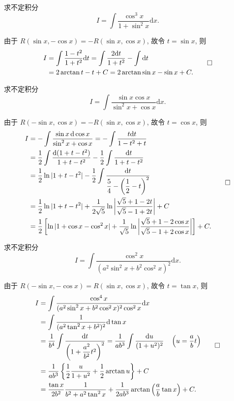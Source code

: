 \begin{example}\label{example:ma-6-3-4}
求不定积分
\[
  I=\int\frac{\cos^3x}{1+\sin^2x}\mathrm dx.
\]
\end{example}

\begin{solve}
由于 $R(\sin x,-\cos x)=-R(\sin x,\cos x)$, 故令 $t=\sin x$, 则
\[
\begin{aligned}
  I
  &=
  \int\frac{1-t^2}{1+t^2}\mathrm dt
  =
  \int\frac{2\mathrm dt}{1+t^2}-\int\mathrm dt\\
  &=
  2\arctan t-t+C
  =
  2\arctan\sin x-\sin x+C.
\end{aligned}
\qedhere
\]
\end{solve}


\begin{example}\label{example:ma-6-3-5}
求不定积分
\[
  I=\int\frac{\sin x\cos x}{\sin^2x+\cos x}\mathrm dx.
\]
\end{example}

\begin{solve}
由于 $R(-\sin x,\cos x)=-R(\sin x,\cos x)$, 故令 $t=\cos x$, 则
\[
\begin{aligned}
  I
  &=
  -\int\frac{\sin x\,\mathrm d\cos x}{\sin^2x+\cos x}
  =
  -\int\frac{t\mathrm dt}{1-t^2+t}\\
  &=
  \frac12\int\frac{\mathrm d(1+t-t^2)}{1+t-t^2}
  -\frac12\int\frac{\mathrm dt}{1+t-t^2}\\
  &=
  \frac12\ln|1+t-t^2|-\frac12\int\frac{\mathrm dt}{\dfrac54-\left(\dfrac12-t\right)^2}\\
  &=
  \frac12\ln|1+t-t^2|+
  \frac1{2\sqrt5}\ln\left|\frac{\sqrt5+1-2t}{\sqrt5-1+2t}\right|+C\\
  &=
  \frac12\left[
  \ln|1+\cos x-\cos^2x|+
  \frac1{\sqrt5}\ln\left|\frac{\sqrt5+1-2\cos x}{\sqrt5-1+2\cos x}\right|
  \right]+C.
\end{aligned}
\qedhere
\]
\end{solve}


\begin{example}\label{example:ma-6-3-6}
求不定积分
\[
  I=\int\frac{\cos^2x}{(a^2\sin^2x+b^2\cos^2x)^2}\mathrm dx.
\]
\end{example}

\begin{solve}
由于 $R(-\sin x,-\cos x)=R(\sin x,\cos x)$, 故令 $t=\tan x$, 则
\[
\begin{aligned}
  I
  &=
  \int\frac{\cos^4x}{(a^2\sin^2x+b^2\cos^2x)^2\cos^2x}\mathrm dx\\
  &=
  \int\frac{1}{(a^2\tan^2x+b^2)^2}\mathrm d\tan x\\
  &=
  \frac1{b^4}\int\frac{\mathrm dt}{\left(1+\dfrac{a^2}{b^2}t^2\right)^2}
  =
  \frac1{ab^3}\int\frac{\mathrm du}{(1+u^2)^2}\quad\left(u=\frac abt\right)\\
  &=
  \frac1{ab^3}\left\{\frac12\frac u{1+u^2}+\frac12\arctan u\right\}+C\\
  &=
  \frac{\tan x}{2b^2}\frac1{b^2+a^2\tan^2x}
  +\frac1{2ab^3}\arctan\left(\frac ab\tan x\right)+C.
\end{aligned}
\qedhere
\]
\end{solve}


